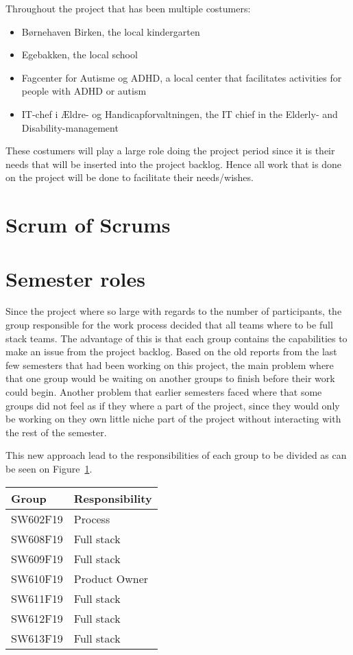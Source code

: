 Throughout the project that has been multiple costumers:

\begin{itemize}
	\item Børnehaven Birken, the local kindergarten
	\item Egebakken, the local school
	\item Fagcenter for Autisme og ADHD, a local center that facilitates activities for people with ADHD or autism
	\item IT-chef i Ældre- og Handicapforvaltningen, the IT chief in the Elderly- and Disability-management
\end{itemize}

These costumers will play a large role doing the project period since it is their needs that will be inserted into the project backlog. 
Hence all work that is done on the project will be done to facilitate their needs/wishes.

\section{Scrum of Scrums}

\section{Semester roles}
Since the project where so large with regards to the number of participants, the group responsible for the work process decided that all teams where to be full stack teams. 
The advantage of this is that each group contains the capabilities to make an issue from the project backlog. 
Based on the old reports from the last few semesters that had been working on this project, the main problem where that one group would be waiting on another groups to finish before their work could begin. 
Another problem that earlier semesters faced where that some groups did not feel as if they where a part of the project, since they would only be working on they own little niche part of the project without interacting with the rest of the semester.

This new approach lead to the responsibilities of each group to be divided as can be seen on Figure~\ref{TBL:GroupResponsibility}.

\begin{table}[H]
\centering
\begin{tabular}{|l|l|}
\hline
\textbf{Group} & \textbf{Responsibility} \\ \hline
SW602F19 & Process\\ \hline
SW608F19 & Full stack\\ \hline
SW609F19 & Full stack\\ \hline
SW610F19 & Product Owner  \\ \hline
SW611F19 & Full stack \\ \hline
SW612F19 & Full stack \\ \hline
SW613F19 & Full stack \\ \hline
\end{tabular}
\label{TBL:GroupResponsibility}
\end{table}

